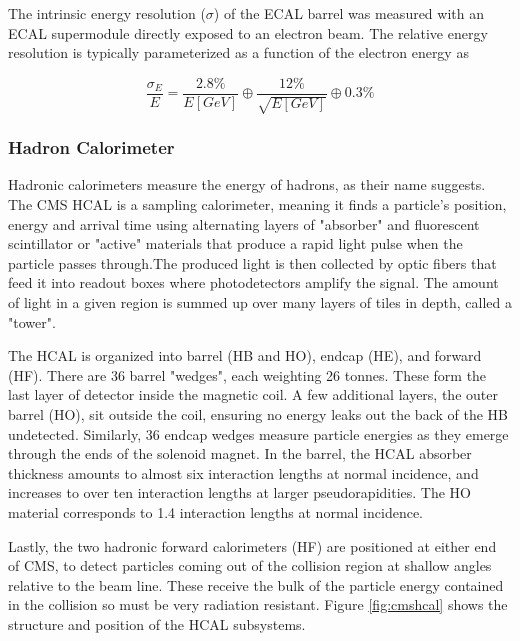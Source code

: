 The intrinsic energy resolution ($\sigma$) of the ECAL barrel was measured with an ECAL supermodule directly exposed to an electron beam\cite{Ingram_2007}. The relative energy resolution is typically parameterized as a function of the electron energy as

\begin{equation}
\frac{\sigma_{E}}{E} = \frac{2.8\%}{E[GeV]} \oplus \frac{12\%}{\sqrt{E[GeV]}} \oplus 0.3\%
\end{equation}

 \subsubsection{Hadron Calorimeter}

Hadronic calorimeters measure the energy of hadrons, as their name suggests. The CMS HCAL\cite{CMS:1997tfa} is a sampling calorimeter, meaning it finds a particle's position, energy and arrival time using alternating layers of "absorber" and fluorescent scintillator or "active" materials that produce a rapid light pulse when the particle passes through.The produced light is then collected by optic fibers that feed it into readout boxes where photodetectors amplify the signal. The amount of light in a given region is summed up over many layers of tiles in depth, called a "tower". 

 The HCAL is organized into barrel (HB and HO), endcap (HE), and forward (HF). There are 36 barrel "wedges", each weighting 26 tonnes. These form the last layer of detector inside the magnetic coil. A few additional layers, the outer barrel (HO), sit outside the coil, ensuring no energy leaks out the back of the HB undetected. Similarly, 36 endcap wedges measure particle energies as they emerge through the ends of the solenoid magnet. In the barrel, the HCAL absorber thickness amounts to almost six interaction lengths at normal incidence, and increases to over ten interaction lengths at larger pseudorapidities. The HO material corresponds to 1.4 interaction lengths at normal incidence.

 Lastly, the two hadronic forward calorimeters (HF) are positioned at either end of CMS, to detect particles coming out of the collision region at shallow angles relative to the beam line. These receive the bulk of the particle energy contained in the collision so must be very radiation resistant. Figure \ref{fig:cmshcal} shows the structure and position of the HCAL subsystems. 

